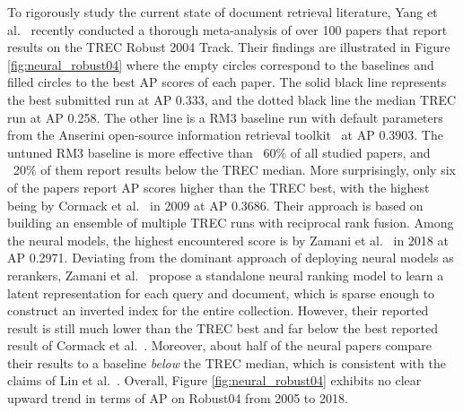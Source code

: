To rigorously study the current state of document retrieval literature, Yang et al.~\cite{Yang_etal_SIGIR2019} recently conducted a thorough meta-analysis of over 100 papers that report results on the TREC Robust 2004 Track.
Their findings are illustrated in Figure \ref{fig:neural_robust04} where the empty circles correspond to the baselines and filled circles to the best AP scores of each paper.
The solid black line represents the best submitted run at AP 0.333, and the dotted black line the median TREC run at AP 0.258.
The other line is a RM3 baseline run with default parameters from the Anserini open-source information retrieval toolkit~\cite{Yang:2018:ARR:3289400.3239571} at AP 0.3903.
The untuned RM3 baseline is more effective than ~60\% of all studied papers, and ~20\% of them report results below the TREC median.
More surprisingly, only six of the papers report AP scores higher than the TREC best, with the highest being by Cormack et al.~\cite{Cormack:2009:RRF:1571941.1572114} in 2009 at AP 0.3686.
Their approach is based on building an ensemble of multiple TREC runs with reciprocal rank fusion.
Among the neural models, the highest encountered score is by Zamani et al.~\cite{zamani2018neural} in 2018 at AP 0.2971.
Deviating from the dominant approach of deploying neural models as rerankers, Zamani et al.~\cite{zamani2018neural} propose a standalone neural ranking model to learn a latent representation for each query and document, which is sparse enough to construct an inverted index for the entire collection.
However, their reported result is still much lower than the TREC best and far below the best reported result of Cormack et al.~\cite{Cormack:2009:RRF:1571941.1572114}.
Moreover, about half of the neural papers compare their results to a baseline \textit{below} the TREC median, which is consistent with the claims of Lin et al.~\cite{lin2019neural}.
Overall, Figure \ref{fig:neural_robust04} exhibits no clear upward trend in terms of AP on Robust04 from 2005 to 2018.


